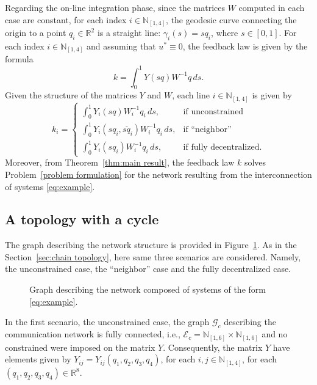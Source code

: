 \documentclass[10pt,twocolumn,twoside]{IEEEtran}
\newcounter{para}
\newcommand\mypara{\par}
\theoremstyle{plain}
\theoremstyle{definition}
\theoremstyle{remark}
\begin{document}
\mypara Regarding the on-line integration phase, since the matrices $W$ computed in each case are  constant, for each index $i\in\mathbb{N}_{[1,4]}$, the geodesic curve connecting the origin to a point $q_i\in\mathbb{R}^2$ is a straight line: $\gamma_i(s)=sq_i$, where $s\in[0,1]$. For each index $i\in\mathbb{N}_{[1,4]}$ and assuming that $u^\ast\equiv0$, the feedback law is  given by the formula
\begin{equation*}
	k= \int_0^1Y(sq)W^{-1}q\,ds.
\end{equation*}
Given the structure of the matrices $Y$ and $W$, each line $i\in\mathbb{N}_{[1,4]}$ is given by
\begin{equation*}
k_i=\begin{cases}
	\displaystyle\int_0^1Y_i(sq)W_i^{-1}q_i\,ds,&\text{if unconstrained}\\
	\displaystyle\int_0^1Y_i(sq_i,s\breve{q}_i)W_i^{-1}q_i\,ds,&\text{if ``neighbor''}\\
	\displaystyle\int_0^1Y_i(sq_i)W_i^{-1}q_i\,ds,&\text{if fully decentralized.}
\end{cases}
\end{equation*}
Moreover, from Theorem~\ref{thm:main result}, the feedback law $k$ solves Problem~\ref{problem formulation} for the network resulting from the interconnection of systems \eqref{eq:example}.

\subsection{A topology with a cycle}

\mypara The graph describing the network structure is provided in Figure~\ref{fig:cycle graph}. As in the Section~\ref{sec:chain topology}, here same three scenarios are considered. Namely, the unconstrained case, the ``neighbor'' case and the fully decentralized case.

\begin{figure}[htpb!]
	\centering
	
	\caption{Graph describing the network composed of systems of the form \eqref{eq:example}.}
	\label{fig:cycle graph}
\end{figure}

\mypara In the first scenario, the unconstrained case, the graph $\mathscr{G}_c$ describing the communication network is fully connected, i.e., $\mathscr{E}_c=\mathbb{N}_{[1,6]}\times\mathbb{N}_{[1,6]}$ and no constrained were imposed on the matrix $Y$. Consequently, the matrix $Y$ have elements given by $Y_{ij}=Y_{ij}(q_1,q_2,q_3,q_4)$, for each $i,j\in\mathbb{N}_{[1,4]}$, for each $(q_1,q_2,q_3,q_4)\in\mathbb{R}^8$.
\end{document}
